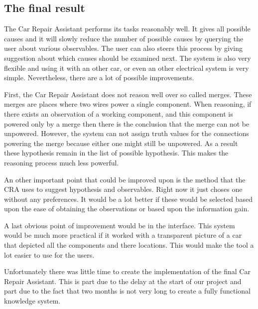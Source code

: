 \subsection{The final result}
The Car Repair Assistant performs its tasks reasonably well. It gives all possible causes and it will slowly reduce the number of possible causes by querying the user about various observables. The user can also steers this process by giving suggestion about which causes should be examined next. The system is also very flexible and using it with an other car, or even an other electrical system is very simple. Nevertheless, there are a lot of possible improvements.

First, the Car Repair Assistant does not reason well over so called merges. These merges are places where two wires power a single component. When reasoning, if there exists an observation of a working component, and this component is powered only by a merge then there is the conclusion that the merge can not be unpowered. However, the system can not assign truth values for the connections powering the merge because either one might still be unpowered. As a result these hypothesis remain in the list of possible hypothesis. This makes the reasoning process much less powerful.

An other important point that could be improved upon is the method that the CRA uses to suggest hypothesis and observables. Right now it just choses one without any preferences. It would be a lot better if these would be selected based upon the ease of obtaining the observations or based upon the information gain.

A last obvious point of improvement would be in the interface. This system would be much more practical if it worked with a transparent picture of a car that depicted all the components and there locations. This would make the tool a lot easier to use for the users.

Unfortunately there was little time to create the implementation of the final Car Repair Assistant. This is part due to the delay at the start of our project and part due to the fact that two months is not very long to create a fully functional knowledge system.
